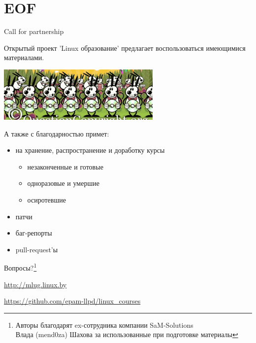 \section{EOF}

\begin{frame}{Call for partnership}
  
  \begin{center}
    Открытый проект 'Linux образование' предлагает воспользоваться имеющимися материалами.
    
    \includegraphics[width=0.6\textwidth]{copying}
  \end{center}

  А также с благодарностью примет:
  \begin{itemize}
    \item на хранение, распространение и доработку курсы
      \begin{itemize}
        \item незаконченные и готовые
        \item одноразовые и умершие
        \item осиротевшие
      \end{itemize}
    \item патчи
    \item баг-репорты
    \item pull-request'ы
  \end{itemize}

\end{frame}


\begin{frame}[fragile]{}

	\Large \alert{Вопросы?}\footnote{Авторы благодарят ex-сотрудника компании SaM-Solutions \\
	  Влада (mend0za) Шахова за использованные при подготовке материалы}

	\hrulefill

	\href{http://mlug.linux.by}{http://mlug.linux.by}

	\href{https://github.com/epam-llpd/linux\_courses}{https://github.com/epam-llpd/linux\_courses}

\end{frame}

